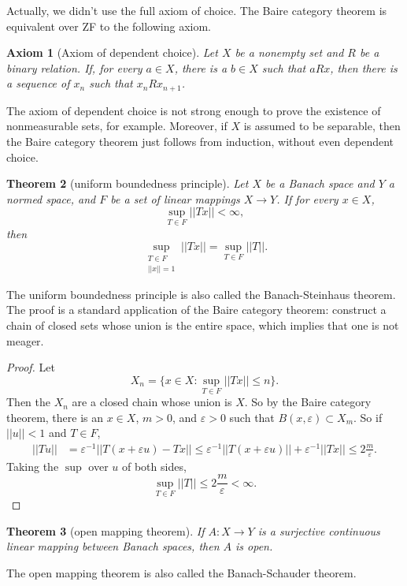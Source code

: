 \documentclass[12pt]{report}
\newtheorem{theorem}{Theorem}[chapter]
\newtheorem{axiom}[theorem]{Axiom}
\theoremstyle{definition}
\begin{document}
Actually, we didn't use the full axiom of choice. The Baire category theorem is equivalent over ZF to the following axiom.
\begin{axiom}[Axiom of dependent choice]
    Let $X$ be a nonempty set and $R$ be a binary relation. If, for every $a \in X$, there is a $b \in X$ such that $aRx$, then there is a sequence of $x_n$ such that $x_nRx_{n+1}$.
\end{axiom}
The axiom of dependent choice is not strong enough to prove the existence of nonmeasurable sets, for example. Moreover, if $X$ is assumed to be separable, then the Baire category theorem just follows from induction, without even dependent choice.

\begin{theorem}[uniform boundedness principle]
    Let $X$ be a Banach space and $Y$ a normed space, and $F$ be a set of linear mappings $X \to Y$. If for every $x \in X$,
    $$\sup_{T \in F} ||Tx|| < \infty,$$
    then
    $$\sup_{\substack{T \in F\\||x|| = 1}} ||Tx|| = \sup_{T \in F} ||T||.$$
\end{theorem}
The uniform boundedness principle is also called the Banach-Steinhaus theorem. The proof is a standard application of the Baire category theorem: construct a chain of closed sets whose union is the entire space, which implies that one is not meager.
\begin{proof}
    Let
    $$X_n = \{x \in X: \sup_{T \in F} ||Tx|| \leq n\}.$$
    Then the $X_n$ are a closed chain whose union is $X$. So by the Baire category theorem, there is an $x \in X$, $m > 0$, and $\varepsilon > 0$ such that $B(x, \varepsilon) \subset X_m$. So if $||u|| < 1$ and $T \in F$,
\begin{align*}
    ||Tu|| &= \varepsilon^{-1} ||T(x + \varepsilon u) - Tx||
        \leq \varepsilon^{-1} ||T(x + \varepsilon u)|| + \varepsilon^{-1} ||Tx||
        \leq 2\frac{m}{\varepsilon}.
\end{align*}
    Taking the $\sup$ over $u$ of both sides,
    $$\sup_{T \in F} ||T|| \leq 2\frac{m}{\varepsilon} < \infty.$$
\end{proof}
\begin{theorem}[open mapping theorem]
    If $A: X \to Y$ is a surjective continuous linear mapping between Banach spaces, then $A$ is open.
\end{theorem}
The open mapping theorem is also called the Banach-Schauder theorem.
\end{document}
